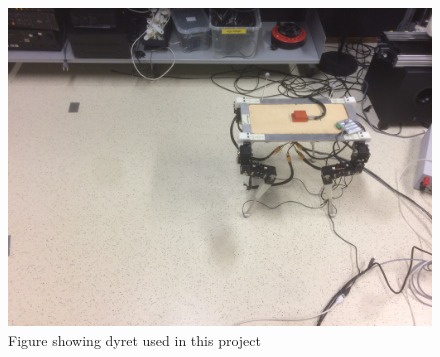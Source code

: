 \documentclass[USenglish]{ifimaster}  %
\begin{document}
\begin{figure}[h]
    \centering
    \includegraphics[width=\textwidth,height=\textheight,keepaspectratio]{Figures/Robot.JPG}
    \caption{Figure showing dyret used in this project}
    \label{fig:robot}
\end{figure}
\end{document}

